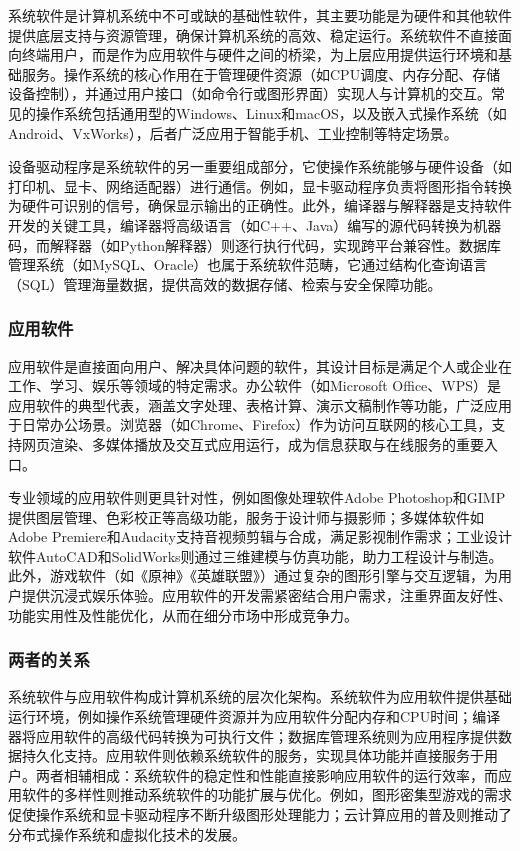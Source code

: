 系统软件是计算机系统中不可或缺的基础性软件，其主要功能是为硬件和其他软件提供底层支持与资源管理，确保计算机系统的高效、稳定运行。系统软件不直接面向终端用户，而是作为应用软件与硬件之间的桥梁，为上层应用提供运行环境和基础服务。操作系统的核心作用在于管理硬件资源（如CPU调度、内存分配、存储设备控制），并通过用户接口（如命令行或图形界面）实现人与计算机的交互。常见的操作系统包括通用型的Windows、Linux和macOS，以及嵌入式操作系统（如Android、VxWorks），后者广泛应用于智能手机、工业控制等特定场景。

设备驱动程序是系统软件的另一重要组成部分，它使操作系统能够与硬件设备（如打印机、显卡、网络适配器）进行通信。例如，显卡驱动程序负责将图形指令转换为硬件可识别的信号，确保显示输出的正确性。此外，编译器与解释器是支持软件开发的关键工具，编译器将高级语言（如C++、Java）编写的源代码转换为机器码，而解释器（如Python解释器）则逐行执行代码，实现跨平台兼容性。数据库管理系统（如MySQL、Oracle）也属于系统软件范畴，它通过结构化查询语言（SQL）管理海量数据，提供高效的数据存储、检索与安全保障功能。

\subsubsection{应用软件}

应用软件是直接面向用户、解决具体问题的软件，其设计目标是满足个人或企业在工作、学习、娱乐等领域的特定需求。办公软件（如Microsoft Office、WPS）是应用软件的典型代表，涵盖文字处理、表格计算、演示文稿制作等功能，广泛应用于日常办公场景。浏览器（如Chrome、Firefox）作为访问互联网的核心工具，支持网页渲染、多媒体播放及交互式应用运行，成为信息获取与在线服务的重要入口。

专业领域的应用软件则更具针对性，例如图像处理软件Adobe Photoshop和GIMP提供图层管理、色彩校正等高级功能，服务于设计师与摄影师；多媒体软件如Adobe Premiere和Audacity支持音视频剪辑与合成，满足影视制作需求；工业设计软件AutoCAD和SolidWorks则通过三维建模与仿真功能，助力工程设计与制造。此外，游戏软件（如《原神》《英雄联盟》）通过复杂的图形引擎与交互逻辑，为用户提供沉浸式娱乐体验。应用软件的开发需紧密结合用户需求，注重界面友好性、功能实用性及性能优化，从而在细分市场中形成竞争力。

\subsubsection{两者的关系}

系统软件与应用软件构成计算机系统的层次化架构。系统软件为应用软件提供基础运行环境，例如操作系统管理硬件资源并为应用软件分配内存和CPU时间；编译器将应用软件的高级代码转换为可执行文件；数据库管理系统则为应用程序提供数据持久化支持。应用软件则依赖系统软件的服务，实现具体功能并直接服务于用户。两者相辅相成：系统软件的稳定性和性能直接影响应用软件的运行效率，而应用软件的多样性则推动系统软件的功能扩展与优化。例如，图形密集型游戏的需求促使操作系统和显卡驱动程序不断升级图形处理能力；云计算应用的普及则推动了分布式操作系统和虚拟化技术的发展。

